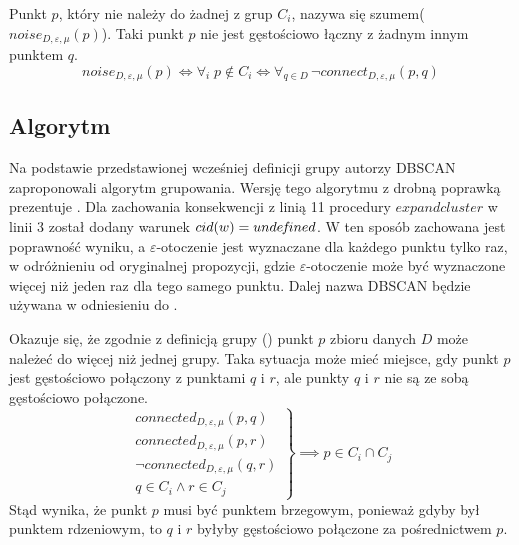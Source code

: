 

\newline
Punkt $ p $, który nie należy do żadnej z grup $ C_i $, nazywa się szumem\linebreak ($ noise_{D,\varepsilon,\mu}(p) $). Taki punkt $ p $ nie jest gęstościowo łączny z żadnym innym punktem $ q $.
\begin{equation}
	noise_{D,\varepsilon,\mu}(p) \iff \forall_i \;p\notin C_i \iff \forall_{q \in D} \,\neg connect_{D,\varepsilon,\mu}(p,q)
\end{equation}
	
\subsection{Algorytm}
Na podstawie przedstawionej wcześniej definicji grupy autorzy DBSCAN zaproponowali algorytm grupowania. Wersję tego algorytmu z drobną poprawką prezentuje . Dla zachowania konsekwencji z linią 11 procedury $ expandcluster $ w linii 3 został dodany warunek $ cid(w) = unde\hspace{-0.1em}f\hspace{-0.1em}{}ined $. W ten sposób zachowana jest poprawność wyniku, a $ \varepsilon $-otoczenie jest wyznaczane dla każdego punktu tylko raz, w odróżnieniu od oryginalnej propozycji, gdzie $ \varepsilon $-otoczenie może być wyznaczone więcej niż jeden raz dla tego samego punktu. Dalej nazwa DBSCAN będzie używana w odniesieniu do .

Okazuje się, że zgodnie z definicją grupy () punkt $ p $ zbioru danych $ D $ może należeć do więcej niż jednej grupy. Taka sytuacja może mieć miejsce, gdy punkt $ p $ jest gęstościowo połączony z punktami $ q $ i $ r $, ale punkty $ q $ i $ r $ nie są ze sobą gęstościowo połączone.
\begin{equation}
  \left. \begin{array}{r}
		connected_{D,\varepsilon,\mu}(p, q) \\
		connected_{D,\varepsilon,\mu}(p, r) \\
		\neg connected_{D,\varepsilon,\mu}(q, r) \\
	 	q \in C_i \land r \in C_j
	\end{array} \right\}
	\implies	p \in C_i \cap C_j
\end{equation}
Stąd wynika, że punkt $ p $ musi być punktem brzegowym, ponieważ gdyby był punktem rdzeniowym, to $ q $ i $ r $ byłyby gęstościowo połączone za pośrednictwem $ p $.

